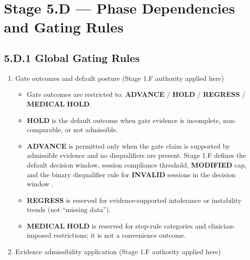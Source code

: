 \documentclass[10pt]{article}
\begin{document}
\section*{Stage 5.D — Phase Dependencies and Gating Rules}
{}

\subsection*{5.D.1 Global Gating Rules}
{}

\begin{enumerate}
\item Gate outcomes and default posture (Stage 1.F authority applied here)

\begin{itemize}
\item Gate outcomes are restricted to: \textbf{ADVANCE} / \textbf{HOLD} / \textbf{REGRESS} / \textbf{MEDICAL} \textbf{HOLD}.
\item \textbf{HOLD} is the default outcome when gate evidence is incomplete, non-comparable, or not admissible.
\item \textbf{ADVANCE} is permitted only when the gate claim is supported by admissible evidence and no disqualifiers are present. Stage 1.F defines the default decision window, session compliance threshold, \textbf{MODIFIED} cap, and the binary disqualifier rule for \textbf{INVALID} sessions in the decision window .
\item \textbf{REGRESS} is reserved for evidence-supported intolerance or instability trends (not “missing data”).
\item \textbf{MEDICAL} \textbf{HOLD} is reserved for stop-rule categories and clinician-imposed restrictions; it is not a convenience outcome.
\end{itemize}

\item Evidence admissibility application (Stage 1.F authority applied here)


\end{enumerate}
\end{document}
